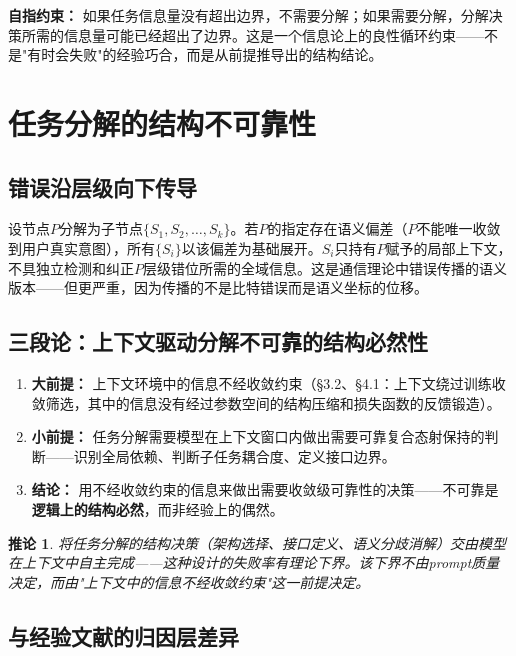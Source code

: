 \documentclass[11pt,a4paper]{ctexart}
\newtheorem{corollary}[theorem]{推论}
\begin{document}
\textbf{自指约束：} 如果任务信息量没有超出边界，不需要分解；如果需要分解，分解决策所需的信息量可能已经超出了边界。这是一个信息论上的良性循环约束——不是"有时会失败"的经验巧合，而是从前提推导出的结构结论。


\section{任务分解的结构不可靠性}

\subsection{错误沿层级向下传导}

设节点$P$分解为子节点$\{S_1, S_2, \dots, S_k\}$。若$P$的指定存在语义偏差（$P$不能唯一收敛到用户真实意图），所有$\{S_i\}$以该偏差为基础展开。$S_i$只持有$P$赋予的局部上下文，不具独立检测和纠正$P$层级错位所需的全域信息。这是通信理论中错误传播的语义版本——但更严重，因为传播的不是比特错误而是语义坐标的位移。

\subsection{三段论：上下文驱动分解不可靠的结构必然性}

\begin{enumerate}[leftmargin=*]
    \item \textbf{大前提：} 上下文环境中的信息不经收敛约束（§3.2、§4.1：上下文绕过训练收敛筛选，其中的信息没有经过参数空间的结构压缩和损失函数的反馈锻造）。
    \item \textbf{小前提：} 任务分解需要模型在上下文窗口内做出需要可靠复合态射保持的判断——识别全局依赖、判断子任务耦合度、定义接口边界。
    \item \textbf{结论：} 用不经收敛约束的信息来做出需要收敛级可靠性的决策——不可靠是\textbf{逻辑上的结构必然}，而非经验上的偶然。
\end{enumerate}

\begin{corollary}
    将任务分解的结构决策（架构选择、接口定义、语义分歧消解）交由模型在上下文中自主完成——这种设计的失败率有理论下界。该下界不由prompt质量决定，而由"上下文中的信息不经收敛约束"这一前提决定。
\end{corollary}

\subsection{与经验文献的归因层差异}
\end{document}
